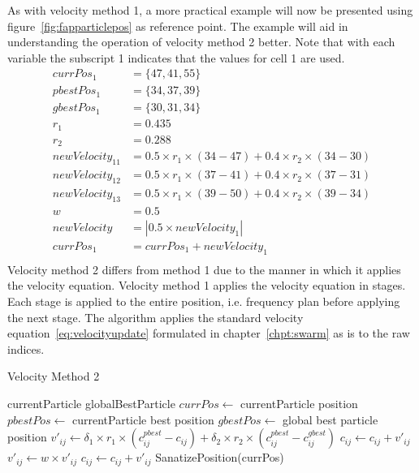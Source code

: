 As with velocity method 1, a more practical example will now be presented using figure~\ref{fig:fapparticlepos} as reference point. The example will aid in understanding the operation of velocity method 2 better. Note that with each variable the subscript 1 indicates that the values for cell 1 are used.
\begin{align}
    currPos_1 &= \{47,41,55\}\nonumber \\
    pbestPos_1 &= \{34,37,39\}\nonumber \\
    gbestPos_1 &= \{30, 31,34\}\nonumber \\
    r_1 &= 0.435\nonumber \\
    r_2 &= 0.288\nonumber \\
    newVelocity_{11} &= 0.5 \times r_1 \times (34 - 47) + 0.4 \times r_2 \times (34 - 30)\nonumber \\
    newVelocity_{12} &= 0.5 \times r_1 \times (37 - 41) + 0.4 \times r_2 \times (37 - 31)\nonumber \\
    newVelocity_{13} &= 0.5 \times r_1 \times (39 - 50) + 0.4 \times r_2 \times (39 - 34)\nonumber \\
    w &= 0.5\nonumber \\
    newVelocity &= |0.5 \times newVelocity_1|\nonumber \\
    currPos_1 &= currPos_1 + newVelocity_1\nonumber \\
\end{align}
Velocity method 2 differs from method 1 due to the manner in which it applies the velocity equation. Velocity method 1 applies the velocity equation in stages. Each stage is applied to the entire position, i.e. frequency plan before applying the next stage. The algorithm applies the standard velocity equation~\ref{eq:velocityupdate} formulated in chapter~\ref{chpt:swarm} as is to the raw indices.
\begin{algorithm}[H]
\caption{Velocity Method 2}
\label{alg:velocitymethod2}
\begin{algorithmic}[1]
	\Require currentParticle
	\Require globalBestParticle
	\State $currPos \leftarrow$ currentParticle position
	\State $pbestPos \leftarrow$ currentParticle best position
	\State $gbestPos \leftarrow$ global best particle position
		\State $v'_{ij} \leftarrow \delta_1 \times r_1 \times (c^{pbest}_{ij} - c_{ij}) + \delta_2 \times r_2 \times (c^{pbest}_{ij} - c^{gbest}_{ij})$
			\State $c_{ij} \leftarrow c_{ij} + v'_{ij}$
		\Else
			\State $v'_{ij} \leftarrow w \times v'_{ij}$
			\State $c_{ij} \leftarrow c_{ij} + v'_{ij}$
		\EndIf
	\EndFor
	\State SanatizePosition(currPos)
\end{algorithmic}
\end{algorithm}


